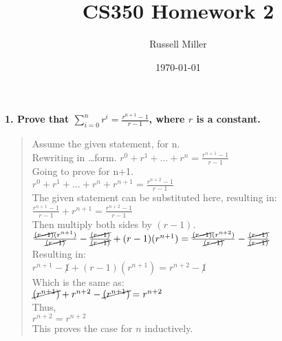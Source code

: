 \documentclass{article}
\title{CS350 Homework 2}
\author{Russell Miller}
\date{\today}
\begin{document}
\maketitle

\section*{}
\textbf{1. Prove that $\displaystyle\sum\limits_{i=0}^n r^i = \frac{r^{n+1}-1}{r-1}$, 
where $r$ is a constant.}
\begin{quote}
\textsf{Assume the given statement, for n.\\
Rewriting in \ldots form. $r^0 + r^1 + \ldots + r^n = \frac{r^{n+1}-1}{r-1}$\\
Going to prove for n+1.\\
$r^0 + r^1 + \ldots + r^n + r^{n+1} = \frac{r^{n+2}-1}{r-1}$\\
The given statement can be substituted here, resulting in:\\
$\frac{r^{n+1}-1}{r-1} + r^{n+1} = \frac{r^{n+2}-1}{r-1}$\\
Then multiply both sides by $(r-1)$.\\
$\frac{\cancel{(r-1)}(r^{n+1})}{\cancel{(r-1)}} - \frac{\cancel{(r-1)}}{\cancel{(r-1)}}
+ (r-1)(r^{n+1}) = \frac{\cancel{(r-1)}(r^{n+2})}{\cancel{(r-1)}}
- \frac{\cancel{(r-1)}}{\cancel{(r-1)}}$\\
Resulting in:\\
$r^{n+1} - \not1 + (r-1)(r^{n+1}) = r^{n+2} - \not1$\\
Which is the same as:\\
$\cancel{(r^{n+1})} + r^{n+2} - \cancel{(r^{n+1})} = r^{n+2}$\\
Thus,\\
$r^{n+2} = r^{n+2}$\\
This proves the case for $n$ inductively.\\}
\end{quote}
\end{document}
